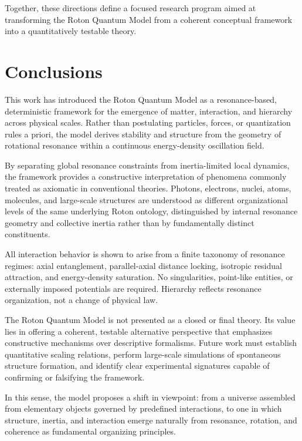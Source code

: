 \documentclass[11pt,a4paper]{article}
\begin{document}
Together, these directions define a focused research program aimed at transforming the
Roton Quantum Model from a coherent conceptual framework into a quantitatively testable
theory.


\section{Conclusions}

This work has introduced the Roton Quantum Model as a resonance-based, deterministic framework
for the emergence of matter, interaction, and hierarchy across physical scales.
Rather than postulating particles, forces, or quantization rules a priori, the model derives
stability and structure from the geometry of rotational resonance within a continuous
energy-density oscillation field.

By separating global resonance constraints from inertia-limited local dynamics, the framework
provides a constructive interpretation of phenomena commonly treated as axiomatic in
conventional theories.
Photons, electrons, nuclei, atoms, molecules, and large-scale structures are understood as
different organizational levels of the same underlying Roton ontology, distinguished by
internal resonance geometry and collective inertia rather than by fundamentally distinct
constituents.

All interaction behavior is shown to arise from a finite taxonomy of resonance regimes:
axial entanglement, parallel-axial distance locking, isotropic residual attraction, and
energy-density saturation.
No singularities, point-like entities, or externally imposed potentials are required.
Hierarchy reflects resonance organization, not a change of physical law.

The Roton Quantum Model is not presented as a closed or final theory.
Its value lies in offering a coherent, testable alternative perspective that emphasizes
constructive mechanisms over descriptive formalisms.
Future work must establish quantitative scaling relations, perform large-scale simulations
of spontaneous structure formation, and identify clear experimental signatures capable of
confirming or falsifying the framework.

In this sense, the model proposes a shift in viewpoint: from a universe assembled from
elementary objects governed by predefined interactions, to one in which structure, inertia,
and interaction emerge naturally from resonance, rotation, and coherence as fundamental
organizing principles.
\end{document}
